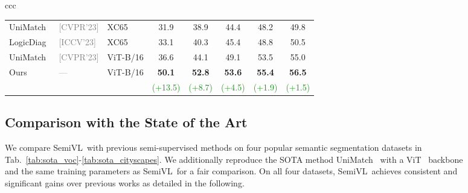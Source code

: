 \documentclass[10pt,twocolumn,letterpaper]{article}
\newcommand{\ours}{SemiVL}
\newcommand{\green}[1]{\textcolor{ForestGreen}{#1}}
\newcommand{\venue}[1]{{\tiny\textcolor{gray}{[#1]}}}
\begin{document}
\begin{figure*}
\begin{tabular}{ccc}
\begin{table}
\begin{tabular}{lllccccc}
          UniMatch~\cite{yang2023revisiting} &                        \venue{CVPR'23} &                      XC65 &            31.9 &           38.9 &           44.4 &           48.2 &           49.8 \\
             LogicDiag~\cite{liang2023logic} &                        \venue{ICCV'23} &                      XC65 &            33.1 &           40.3 &           45.4 &           48.8 &           50.5 \\
\midrule
UniMatch~\cite{yang2023revisiting} &                        \venue{CVPR'23} &                  ViT-B/16 &            36.6 &           44.1 &           49.1 &           53.5 &           55.0 \\
                       \multirow{2}{*}{Ours} & \multirow{2}{*}{\textcolor{gray}{---}} & \multirow{2}{*}{ViT-B/16} &            \textbf{50.1} &           \textbf{52.8} &           \textbf{53.6} &           \textbf{55.4} &           \textbf{56.5} \\
                                             &                                        &                           & \green{(+13.5)} & \green{(+8.7)} & \green{(+4.5)} & \green{(+1.9)} & \green{(+1.5)} \\
\bottomrule
\end{tabular}
\end{table} 
\subsection{Comparison with the State of the Art}

We compare \ours\ with previous semi-supervised methods on four popular semantic segmentation datasets in Tab.~\ref{tab:sota_voc}-\ref{tab:sota_cityscapes}.
We additionally reproduce the SOTA method UniMatch~\cite{yang2023revisiting} with a ViT~\cite{dosovitskiy2020image} backbone and the same training parameters as \ours\ for a fair comparison.
On all four datasets, \ours\ achieves consistent and significant gains over previous works as detailed in the following.


\end{tabular}
\end{figure*}
\end{document}
